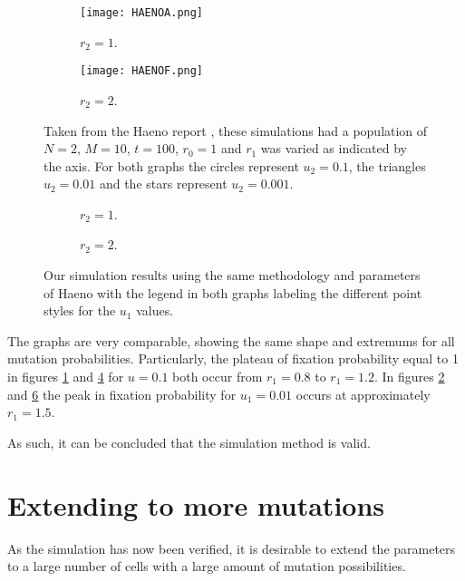 \documentclass[12pt, a4paper,]{article}
\let\cite=\supercite
\begin{document}
\begin{figure}[H]
	\begin{subfigure}[h]{0.5 \textwidth}
		\texttt{[image: HAENOA.png]}
		\caption{$r_2 = 1$.}
		\label{fig:HaenoA}
	\end{subfigure}
	\begin{subfigure}[h]{0.5 \textwidth}
		\texttt{[image: HAENOF.png]}
		\caption{$r_2 = 2$.}
		\label{fig:HaenoF}
	\end{subfigure}	
	\caption{Taken from the Haeno report \cite{haeno_stochastic_2013}, these simulations had a population of $N=2$, $M=10$, $t=100$, $r_0 = 1$ and $r_1$ was varied as indicated by the axis. For both graphs the circles represent $u_2 = 0.1$, the triangles $u_2 = 0.01$ and the stars represent $u_2 = 0.001$.}
	\label{fig:Haeno}
\end{figure}

\begin{figure}[H]
	\begin{subfigure}[h]{0.5\textwidth}
		
		\vspace{-0.50cm}
		\caption{$r_2 = 1$. }
		\label{fig:OurA}
	\end{subfigure}
	\hspace{1mm}
	\begin{subfigure}[h]{0.5\textwidth} 
		
		\vspace{-0.50cm}
		\caption{$r_2 = 2$.}
		\label{fig:OurF}
	\end{subfigure}
	\caption{Our simulation results using the same methodology and parameters of Haeno \cite{haeno_stochastic_2013} with the legend in both graphs labeling the different point styles for the $u_1$ values.}
\end{figure}

The graphs are very comparable, showing the same shape and  extremums for all mutation probabilities. Particularly, the plateau of fixation probability equal to 1 in figures \ref{fig:HaenoA} and \ref{fig:OurA} for $u=0.1$ both occur from $r_1 =0.8$ to $r_1 = 1.2$. In figures \ref{fig:HaenoF} and \ref{fig:OurF} the peak in fixation probability for $u_1 = 0.01$ occurs at approximately $r_1 = 1.5$.  

As such, it can be concluded that the simulation method is valid. 

\section{Extending to more mutations}
As the simulation has now been verified, it is desirable to extend the parameters to a large number of cells with a large amount of mutation possibilities. 
\end{document}

